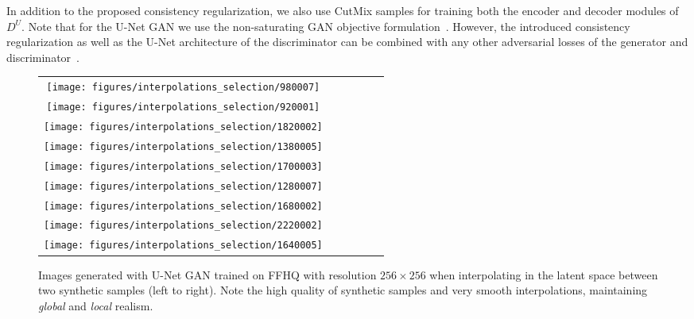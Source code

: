 \documentclass[10pt,twocolumn,letterpaper]{article}
\begin{document}
In addition to the proposed consistency regularization, we also use CutMix samples for training both the encoder and decoder modules of $D^U$.  Note that for the U-Net GAN we use the non-saturating GAN objective formulation~\cite{goodfellow2014generative}. However, the introduced consistency regularization as well as the U-Net architecture of the discriminator can be combined with any other adversarial losses of the generator and discriminator~\cite{Arjovsky2017WGAN,Lim2017GeometricG,Nowozin2016fGANTG}.














\begin{figure*}
\begin{centering}
\setlength{\tabcolsep}{0.1em}
\renewcommand{\arraystretch}{0}
\par\end{centering}
\begin{centering}
\vspace{-1.5em}
\hfill{}\begin{tabular}{c@{\hskip 0.05in}c@{\hskip 0.05in}c@{\hskip 0.05in}c@{\hskip 0.05in}c@{\hskip 0.05in}c}
\texttt{[image: figures/interpolations\_selection/980007]}\tabularnewline
\texttt{[image: figures/interpolations\_selection/920001]}\tabularnewline
\texttt{[image: figures/interpolations\_selection/1820002]}\tabularnewline
\texttt{[image: figures/interpolations\_selection/1380005]}\tabularnewline
\texttt{[image: figures/interpolations\_selection/1700003]}\tabularnewline
\texttt{[image: figures/interpolations\_selection/1280007]}\tabularnewline
\texttt{[image: figures/interpolations\_selection/1680002]}\tabularnewline
\texttt{[image: figures/interpolations\_selection/2220002]}\tabularnewline
\texttt{[image: figures/interpolations\_selection/1640005]}\tabularnewline







\end{tabular}\hfill{}
\par\end{centering}
\vspace{-0.5em}
\caption{\label{fig:qual_results} Images generated with U-Net GAN trained on FFHQ with resolution $256 \times 256$ when interpolating in the latent space between two synthetic samples (left to right). Note the high quality of synthetic samples and very smooth interpolations, maintaining \textit{global} and \textit{local} realism.} \vspace{0em}
\end{figure*}
 
\end{document}
